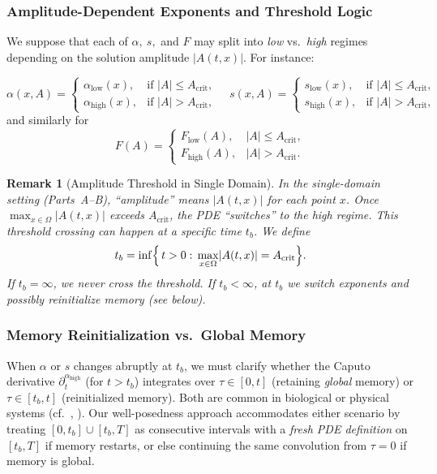 \documentclass[12pt]{article}
\newtheorem{remark}[theorem]{Remark}
\begin{document}
\subsubsection{Amplitude-Dependent Exponents and Threshold Logic}
\label{subsubsec:amplitude_exponents}

We suppose that each of \(\alpha,\ s,\) and \(F\) may split into \emph{low} vs.\ 
\emph{high} regimes depending on the solution amplitude \(\lvert A(t,x)\rvert\). 
For instance:

\[
\alpha(x,A)
=
\begin{cases}
\alpha_{\mathrm{low}}(x), & \text{if } \lvert A\rvert \le A_{\mathrm{crit}},\\
\alpha_{\mathrm{high}}(x), & \text{if } \lvert A\rvert > A_{\mathrm{crit}},
\end{cases}
\quad
s(x,A)
=
\begin{cases}
s_{\mathrm{low}}(x), & \text{if } \lvert A\rvert \le A_{\mathrm{crit}},\\
s_{\mathrm{high}}(x), & \text{if } \lvert A\rvert > A_{\mathrm{crit}},
\end{cases}
\]
and similarly for
\[
F(A)
=
\begin{cases}
F_{\mathrm{low}}(A), & \lvert A\rvert \le A_{\mathrm{crit}},\\
F_{\mathrm{high}}(A), & \lvert A\rvert > A_{\mathrm{crit}}.
\end{cases}
\]

\begin{remark}[Amplitude Threshold in Single Domain]
In the single-domain setting (Parts~A--B), “amplitude” means \(\lvert A(t,x)\rvert\) 
for each point \(x\). Once \(\max_{x\in \Omega}\lvert A(t,x)\rvert\) exceeds 
\(A_{\mathrm{crit}}\), the PDE “switches” to the high regime. 
This threshold crossing can happen at a specific time \(t_b\). We define
\[
t_b
=
\inf\Bigl\{\,t>0:\,\max_{x\in\Omega}\lvert A(t,x)\rvert 
= A_{\mathrm{crit}}\Bigr\}.
\]
If $t_b=\infty$, we never cross the threshold. If $t_b<\infty$, at $t_b$ we switch 
exponents and possibly reinitialize memory (see below).
\end{remark}

\subsubsection{Memory Reinitialization vs.\ Global Memory}
\label{subsubsec:memory_reinit}

When \(\alpha\) or \(s\) changes abruptly at \(t_b\), we must clarify whether the 
Caputo derivative $\partial_t^{\alpha_{\mathrm{high}}}$ (for $t>t_b$) integrates over 
$\tau\in [0,t]$ (retaining \emph{global} memory) or $\tau\in[t_b,t]$ (reinitialized memory).  
Both are common in biological or physical systems (cf.\ \cite[Ch.~6]{Magin2006}, 
\cite{Sun2019}). Our well-posedness approach accommodates either scenario by treating 
$[0,t_b]\cup [t_b,T]$ as consecutive intervals with a \emph{fresh PDE definition} 
on $[t_b,T]$ if memory restarts, or else continuing the same convolution from $\tau=0$ 
if memory is global.
\end{document}
